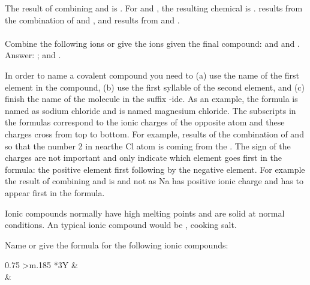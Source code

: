\documentclass[main.tex]{subfiles}
\begin{document}
\begin{description}
\begin{example}
The result of combining  and    is . For  and  , the resulting chemical is  .  results from the combination of   and  , and   results from   and  .\\
\faDiamond\ \\
Combine the following ions or give the ions given the final compound:  and   and .\\
\flushright Answer: ;   and  .
\end{example}%


\item[\docfilehook{Simple ionic naming}{Simple ionic naming}] In order to name a covalent compound you need to (a) use the name of the first element in the compound, (b) use the first syllable of the second element, and (c) finish the name of the molecule in the suffix -ide. As an example, the formula  is named as sodium chloride and   is named magnesium chloride.
The subscripts in the formulas correspond to the ionic charges of the opposite atom and these charges cross from top to bottom. For example, results of the combination of  and  so that the number 2 in  nearthe Cl atom is coming from the . The sign of the charges are not important and only indicate which element goes first in the formula: the positive element first following by the negative element. For example the result of combining  and  is  and not  as Na has positive ionic charge and has to appear first in the formula.
\item[\docfilehook{Properties of ionic compounds}{Properties of ion compounds}] Ionic compounds normally have high melting points and are solid at normal conditions. An typical ionic compound would be , cooking salt.
\begin{example} %
Name or give the formula for the following ionic compounds: \\
\begin{tabularx}{0.75\textwidth}{
    >{\centering}m{.185\linewidth} 
    *{3}{Y} }
  \toprule
{} &    \\
    \midrule
   & 	    \\

\end{tabularx}
\end{example}
\end{description}
\end{document}
